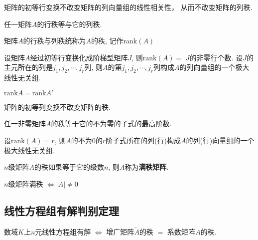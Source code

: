 \begin{Theorem}
矩阵的初等行变换不改变矩阵的列向量组的线性相关性， 从而不改变矩阵的列秩.
\end{Theorem}

\begin{Theorem}
任一矩阵$A$的行秩等与它的列秩.
\end{Theorem}

\begin{Definition}
矩阵$A$的行秩与列秩统称为$A$的秩, 记作$\text{rank}(A)$
\end{Definition}

\begin{Corollary}
设矩阵$A$经过初等行变换化成阶梯型矩阵$J$, 则$\text{rank}(A) =$ $J$的非零行个数. 设$J$的主元所在的列是$j_1, j_2, \cdots, j_r$列, 则$A$的第$j_1, j_2, \cdots, j_r$列构成$A$的列向量组的一个极大线性无关组.
\end{Corollary}

\begin{Corollary}
$\text{rank} A = \text{rank} A' $
\end{Corollary}

\begin{Corollary}
矩阵的初等列变换不改变矩阵的秩.
\end{Corollary}

\begin{Theorem}[!]
任一非零矩阵$A$的秩等于它的不为零的子式的最高阶数.
\end{Theorem}

\begin{Corollary}
设$\text{rank}(A) = r$, 则$A$的不为$0$的$r$阶子式所在的列(行)构成$A$的列(行)向量组的一个极大线性无关组.
\end{Corollary}

\begin{Definition}[!, 满秩矩阵]
$n$级矩阵$A$的秩如果等于它的级数$n$, 则$A$称为\textbf{满秩矩阵}.
\end{Definition}

\begin{Corollary}[!]
$n$级矩阵满秩 $\Leftrightarrow |A| \neq 0$
\end{Corollary}

\subsection{线性方程组有解判别定理}

\begin{Theorem}
数域$K$上$n$元线性方程组有解 $\iff$ 增广矩阵$\tilde{A}$的秩 $=$ 系数矩阵$A$的秩.
\end{Theorem}


